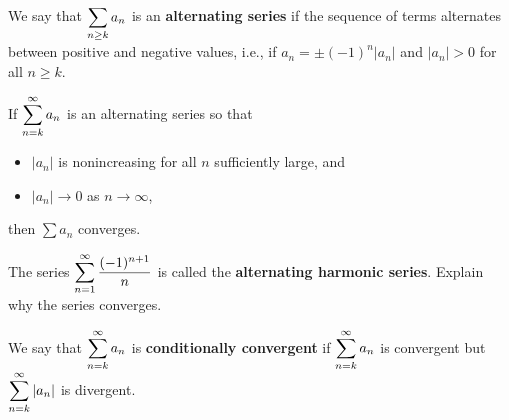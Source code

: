 

\begin{definition}
We say that $\displaystyle\sum_{n\ge k} a_n$ is an \textbf{alternating series} if the sequence of terms alternates between positive and negative values, 
i.e., if $a_n = \pm(-1)^n|a_n|$ and $|a_n|>0$ for all $n\ge k$. 
\end{definition}

\begin{theorem}
If $\displaystyle\sum_{n=k}^\infty a_n$ is an alternating series so that
\begin{itemize}
\item $|a_n|$ is nonincreasing for all $n$ sufficiently large, and
\item $|a_n|\to 0$ as $n\to\infty$,
\end{itemize}
then $\sum a_n$ converges.
\end{theorem}

\begin{example}
The series $\displaystyle\sum_{n=1}^\infty\frac{(-1)^{n+1}}{n}$ is called the \textbf{alternating harmonic series}.
Explain why the series converges.
\end{example}
\ifdefined\SOLUTION
{}
\fi

\vfill

\begin{definition}
We say that $\displaystyle\sum_{n=k}^\infty a_n$ is \textbf{conditionally convergent} 
if $\displaystyle\sum_{n=k}^\infty a_n$ is convergent but $\displaystyle\sum_{n=k}^\infty |a_n|$ is divergent. 
\end{definition}

\newpage

